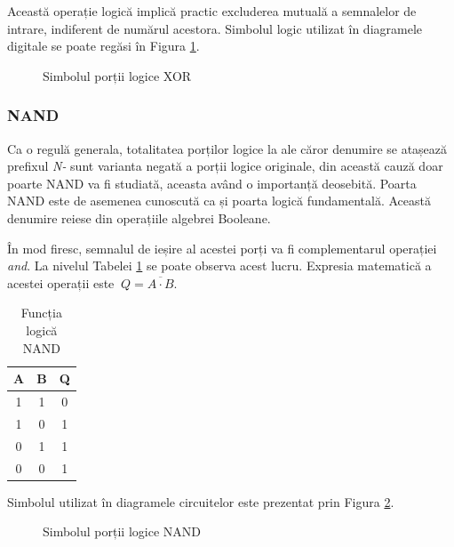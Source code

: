 \documentclass[12pt]{article}
\begin{document}
Această operație logică implică practic excluderea mutuală a semnalelor de intrare, indiferent de numărul acestora. Simbolul logic utilizat în diagramele digitale se poate regăsi în Figura \ref{Figura:8}.
 \begin{figure}[h!]
 \centering
 \caption{Simbolul porții logice XOR}
  \label{Figura:8}
 \end{figure}

\newpage
\subsubsection{NAND}
Ca o regulă generala, totalitatea porților logice la ale căror denumire se atașează prefixul \textit{N-} sunt varianta negată a porții logice originale, din această cauză doar poarte NAND va fi studiată, aceasta având o importanță deosebită. Poarta NAND este de asemenea cunoscută ca și poarta logică fundamentală. Această denumire reiese din operațiile algebrei Booleane.

 În mod firesc, semnalul de ieșire al acestei porți va fi complementarul operației \textit{and}. La nivelul Tabelei \ref{Tabela:11} se poate observa acest lucru. Expresia matematică a acestei operații este  $\ Q = \overline{A \cdot B}$.
 \begin{table}[h]
\centering
\caption{Funcția logică NAND}
\label{Tabela:11}
\begin{tabular}{ ||c|c|c|| }
 \hline
 A & B & Q\\ 
 \hline  \hline
 1 & 1 & 0 \\
 \hline
 1 & 0 & 1 \\
 \hline
 0 & 1 & 1 \\
 \hline 
 0 & 0 & 1 \\
 \hline
\end{tabular}
\end{table}

Simbolul utilizat în diagramele circuitelor este prezentat prin Figura \ref{Figura:9}.
 \begin{figure}[h!]
 \centering
 \caption{Simbolul porții logice NAND}
 \label{Figura:9}
 \end{figure}
 
\end{document}
